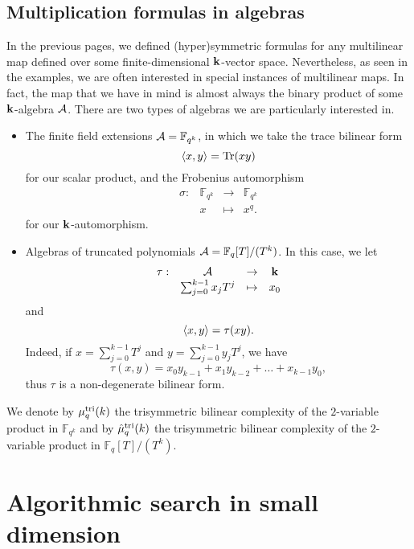 \subsection{Multiplication formulas in algebras}
\label{sec:formulas-algebras}

In the previous pages, we defined (hyper)symmetric formulas for any
multilinear map defined over some finite-dimensional $\mathbf{k}$-vector space.
Nevertheless, as seen in the examples, we are often interested in special
instances of multilinear maps. In fact, the map that we have in mind is almost
always the binary product of some $\mathbf{k}$-algebra $\mathcal{A}$. There are
two types of algebras we are particularly interested in.
\begin{itemize}
  \item The finite field extensions $\mathcal{A}=\mathbb{F}_{q^k}$, in which we take the
    trace bilinear form
    \[
      \left\langle x,y\right\rangle=\operatorname{Tr}(xy)
    \]
    for our scalar product, and the Frobenius automorphism
    \[
  \begin{array}{cccc}
    \sigma: & \mathbb{F}_{q^k} & \to & \mathbb{F}_{q^k} \\
    & x & \mapsto & x^q.
  \end{array}
\]
for our $\mathbf{k}$-automorphism.
\item Algebras of truncated polynomials $\mathcal{A} = \mathbb{F}_q[T]/(T^k)$. In this
  case, we let 
  \[
  \begin{array}{cccc}
    \tau: & \mathcal{A} & \to & \mathbf{k} \\
    & \sum_{j=0}^{k-1}x_j T^j & \mapsto & x_0
  \end{array}
\]
and
\[
  \left\langle x,y\right\rangle = \tau(xy).
\]
Indeed, if $x=\sum_{j=0}^{k-1}T^j$ and $y=\sum_{j=0}^{k-1}y_jT^j$, we have
\[
  \tau(x, y) = x_0y_{k-1} + x_1y_{k-2} + \dots + x_{k-1}y_0,
\]
thus $\tau$ is a non-degenerate bilinear form.
\end{itemize}
We denote by $\mu^{\textrm{tri}}_q(k)$ the trisymmetric bilinear complexity of the
$2$-variable product in $\mathbb{F}_{q^k}$ and by $\hat\mu^{\textrm{tri}}_q(k)$ the
trisymmetric bilinear complexity of the $2$-variable product in
$\mathbb{F}_q[T]/(T^k)$.

\section{Algorithmic search in small dimension}


